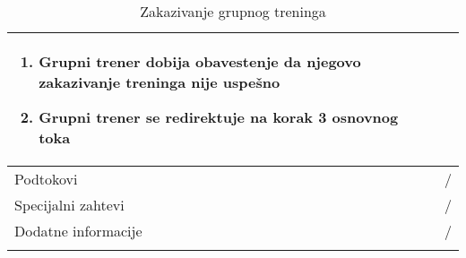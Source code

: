 \documentclass[../grupniTreninzi.tex]{subfiles}
\begin{document}
\begin{longtable}{| p{} | p{} |}
\begin{enumerate}
            \begin{enumerate}
                \item Grupni trener dobija obavestenje da njegovo zakazivanje treninga nije uspešno
                \item Grupni trener se redirektuje na korak 3 osnovnog toka
            \end{enumerate}    
    \end{enumerate}\\
\hline
    Podtokovi & /\\
\hline
    Specijalni zahtevi & /\\
\hline
    Dodatne informacije & /\\
\hline
\caption{Zakazivanje grupnog treninga} %
\end{longtable}
\end{document}
